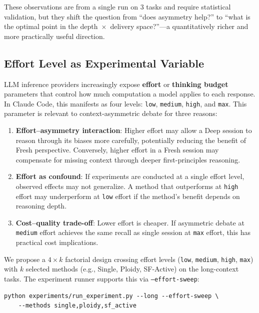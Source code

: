 \documentclass[11pt]{article}
\begin{document}
These observations are from a single run on 3 tasks and require statistical validation, but they shift the question from ``does asymmetry help?'' to ``what is the optimal point in the depth~$\times$~delivery space?''---a quantitatively richer and more practically useful direction.

\subsection{Effort Level as Experimental Variable}
\label{sec:effort}

LLM inference providers increasingly expose \textbf{effort} or \textbf{thinking budget} parameters that control how much computation a model applies to each response. In Claude Code, this manifests as four levels: \texttt{low}, \texttt{medium}, \texttt{high}, and \texttt{max}. This parameter is relevant to context-asymmetric debate for three reasons:

\begin{enumerate}[label=\arabic*., leftmargin=1.5em]
  \item \textbf{Effort--asymmetry interaction}: Higher effort may allow a Deep session to reason through its biases more carefully, potentially reducing the benefit of Fresh perspective. Conversely, higher effort in a Fresh session may compensate for missing context through deeper first-principles reasoning.
  \item \textbf{Effort as confound}: If experiments are conducted at a single effort level, observed effects may not generalize. A method that outperforms at \texttt{high} effort may underperform at \texttt{low} effort if the method's benefit depends on reasoning depth.
  \item \textbf{Cost--quality trade-off}: Lower effort is cheaper. If asymmetric debate at \texttt{medium} effort achieves the same recall as single session at \texttt{max} effort, this has practical cost implications.
\end{enumerate}

We propose a $4 \times k$ factorial design crossing effort levels (\texttt{low}, \texttt{medium}, \texttt{high}, \texttt{max}) with $k$ selected methods (e.g., Single, Ploidy, SF-Active) on the long-context tasks. The experiment runner supports this via \texttt{--effort-sweep}:

\begin{lstlisting}
python experiments/run_experiment.py --long --effort-sweep \
    --methods single,ploidy,sf_active
\end{lstlisting}
\end{document}
